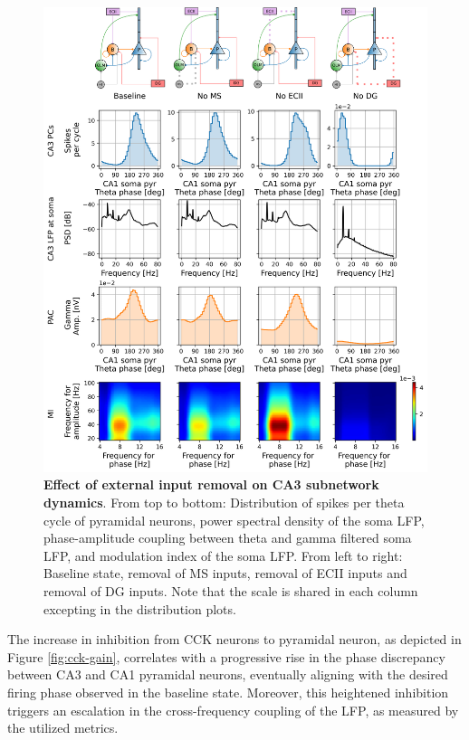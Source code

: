 \documentclass[../main.tex]{subfiles}
\begin{document}
\begin{figure}[htbp]
    \centering
    \includegraphics[width=\textwidth]{chapter4/figures/removing_external_inputs/removing_inputs_ca3_lfp.png}
    \caption{\textbf{Effect of external input removal on CA3 subnetwork dynamics}.
    From top to bottom: Distribution of spikes per theta cycle of pyramidal neurons, power spectral density  of the soma LFP, phase-amplitude coupling between theta and gamma filtered soma LFP, and modulation index of the soma LFP.
    From left to right: Baseline state, removal of MS inputs, removal of ECII inputs and removal of DG inputs.
    Note that the scale is shared in each column excepting in the distribution plots.}
    \label{fig:no-inputs-ca3}
\end{figure}
The increase in inhibition from CCK neurons to pyramidal neuron, as depicted in Figure \ref{fig:cck-gain}, correlates with a progressive rise in the phase discrepancy between CA3 and CA1 pyramidal neurons, eventually aligning with the desired firing phase observed in the baseline state.
Moreover, this heightened inhibition triggers an escalation in the cross-frequency coupling of the LFP, as measured by the utilized metrics.
\end{document}
